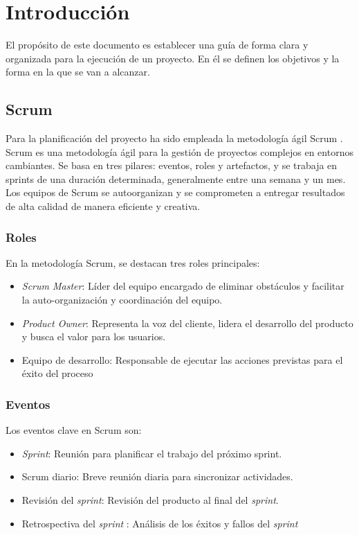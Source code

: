 
\section{Introducción}
El propósito de este documento es establecer una guía de forma clara y organizada para la ejecución de un proyecto. En él se definen los objetivos y la forma en la que se van a alcanzar.


\subsection{Scrum}
Para la planificación del proyecto ha sido empleada la metodología ágil Scrum \cite{scrumMaster2022}. Scrum es una metodología ágil para la gestión de proyectos complejos en entornos cambiantes. Se basa en tres pilares: eventos, roles y artefactos, y se trabaja en sprints de una duración determinada, generalmente entre una semana y un mes. Los equipos de Scrum se autoorganizan y se comprometen a entregar resultados de alta calidad de manera eficiente y creativa.
\subsubsection{Roles}
En la metodología Scrum, se destacan tres roles principales:

\begin{itemize}
\item \textsl{Scrum Master}: Líder del equipo encargado de eliminar obstáculos y facilitar la auto-organización y coordinación del equipo.
\item \textsl{Product Owner}: Representa la voz del cliente, lidera el desarrollo del producto y busca el valor para los usuarios.
\item Equipo de desarrollo: Responsable de ejecutar las acciones previstas para el éxito del proceso
\end{itemize}
\subsubsection{Eventos}
Los eventos clave en Scrum son:
\begin{itemize}


\item \textsl{Sprint}: Reunión para planificar el trabajo del próximo sprint.
\item Scrum diario: Breve reunión diaria para sincronizar actividades.
\item Revisión del \textsl{sprint}: Revisión del producto al final del \textsl{sprint}.
\item Retrospectiva del \textsl{sprint} : Análisis de los éxitos y fallos del \textsl{sprint}
\end{itemize}




